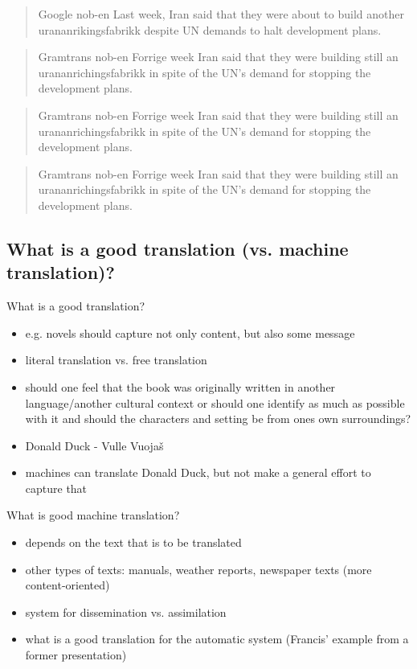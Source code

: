 \documentclass[a4paper,english,12pt]{article}
\begin{document}
\begin{spacing}{1.0}
\begin{quote}
Google nob-en
Last week, Iran said that they were about to build another urananrikingsfabrikk despite UN demands to halt development plans. 
\end{quote}

\begin{quote}
Gramtrans nob-en
Forrige week Iran said that they were building still an urananrichingsfabrikk in spite of the UN's demand for stopping the development plans.
\end{quote}


\begin{quote}
Gramtrans nob-en
Forrige week Iran said that they were building still an urananrichingsfabrikk in spite of the UN's demand for stopping the development plans.
\end{quote}


\begin{quote}
Gramtrans nob-en
Forrige week Iran said that they were building still an urananrichingsfabrikk in spite of the UN's demand for stopping the development plans.
\end{quote}

\subsection{What is a good translation (vs. machine translation)?}

What is a good translation?
\begin{itemize}
\item e.g. novels should capture not only content, but also some message
\item literal translation vs. free translation
\item should one feel that the book was originally written in another language/another cultural context or should one identify as much as possible with it and should the characters and setting be from ones own surroundings?
\item Donald Duck - Vulle Vuojaš
\item machines can translate Donald Duck, but not make a general effort to capture that
\end{itemize}

What is good machine translation?
\begin{itemize}
\item depends on the text that is to be translated
\item other types of texts: manuals, weather reports, newspaper texts (more content-oriented)
\item system for dissemination vs. assimilation
\item what is a good translation for the automatic system (Francis' example from a former presentation)
\end{itemize}


\end{spacing}
\end{document}
